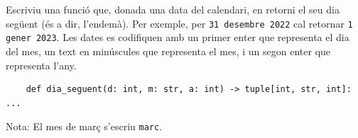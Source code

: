 

\Statement

Escriviu una funció que, donada una data del calendari, en retorni el seu dia següent (és a dir, l'endemà). Per exemple, per \texttt{31 desembre 2022} cal retornar \texttt{1 gener 2023}. Les dates es codifiquen amb un primer enter que representa el dia del mes, un text en minúscules que representa el mes, i un segon enter que representa l'any.

\lstset{language=Python}
\begin{lstlisting}
    def dia_seguent(d: int, m: str, a: int) -> tuple[int, str, int]: ...
\end{lstlisting}

Nota: El mes de març s'escriu \texttt{marc}. 

\ObservationNoMain